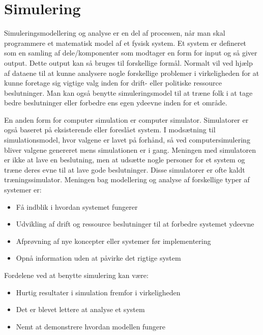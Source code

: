 \chapter{Simulering}\label{Simulering}

Simuleringsmodellering og analyse er en del af processen, når man skal programmere et matematisk model af et fysisk system. Et system er defineret som en samling af dele/komponenter som modtager en form for input og så giver output. Dette output kan så bruges til forskellige formål. Normalt vil ved hjælp af dataene til at kunne analysere nogle forskellige problemer i virkeligheden for at kunne foretage sig vigtige valg inden for drift- eller politiske ressource beslutninger. Man kan også benytte simuleringsmodel til at træne folk i at tage bedre beslutninger eller forbedre ens egen ydeevne inden for et område. \cite[s. 16-20]{SimulationHandbook}

\vspace{5mm}

En anden form for computer simulation er computer simulator. Simulatorer er også baseret på eksisterende eller foreslået system. I modsætning til simulationsmodel, hvor valgene er lavet på forhånd, så ved computersimulering bliver valgene genereret mens simulationen er i gang. Meningen med simulatoren er ikke at lave en beslutning, men at udsætte nogle personer for et system og træne deres evne til at lave gode beslutninger. Disse simulatorer er ofte kaldt træningssimulator. Meningen bag modellering og analyse af forskellige typer af systemer er:

\begin{itemize}
\item Få indblik i hvordan systemet fungerer
\item Udvikling af drift og ressource beslutninger til at forbedre systemet ydeevne
\item Afprøvning af nye koncepter eller systemer før implementering
\item Opnå information uden at påvirke det rigtige system
\end{itemize}

\vspace{5mm}

Fordelene ved at benytte simulering kan være:
\begin{itemize}
\item Hurtig resultater i simulation fremfor i virkeligheden
\item Det er blevet lettere at analyse et system
\item Nemt at demonstrere hvordan modellen fungere
\end{itemize}

